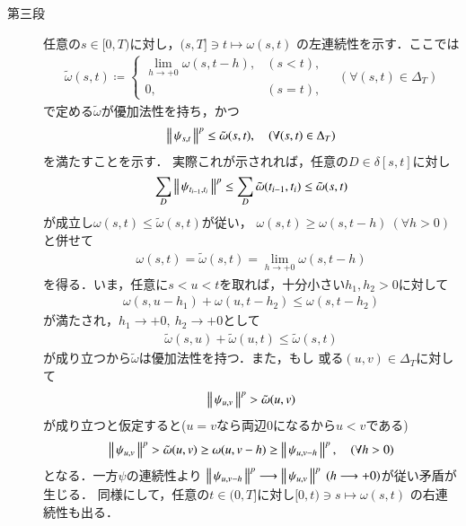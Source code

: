 \begin{prf}
\begin{description}
			\item[第三段]
				任意の$s \in [0,T)$に対し，$(s,T] \ni t \longmapsto \omega(s,t)$
				の左連続性を示す．ここでは
				\begin{align}
					\tilde{\omega}(s,t) \coloneqq 
					\begin{cases}
						\lim_{h \to +0}\omega(s,t-h), & (s < t), \\
						0, & (s=t),
					\end{cases}
					\quad (\forall (s,t) \in \Delta_T)
				\end{align}
				で定める$\tilde{\omega}$が優加法性を持ち，かつ
				\begin{align}
					\left\|\, \psi_{s,t}\, \right\|_{}^p \leq \tilde{\omega}(s,t),
					\quad (\forall (s,t) \in \Delta_T)
				\end{align}
				を満たすことを示す．
				実際これが示されれば，任意の$D \in \delta[s,t]$に対し
				\begin{align}
					\sum_D \left\|\, \psi_{t_{i-1},t_i}\, \right\|_{}^p
					\leq \sum_D \tilde{\omega}(t_{i-1},t_i)
					\leq \tilde{\omega}(s,t)
				\end{align}
				が成立し$\omega(s,t) \leq \tilde{\omega}(s,t)$が従い，
				$\omega(s,t) \geq \omega(s,t-h)\ (\forall h > 0)$と併せて
				\begin{align}
					\omega(s,t) = \tilde{\omega}(s,t) = \lim_{h \to +0} \omega(s,t-h)
				\end{align}
				を得る．いま，任意に$s < u < t$を取れば，十分小さい$h_1,h_2 > 0$に対して
				\begin{align}	
					\omega(s,u-h_1) + \omega(u,t-h_2) \leq \omega(s,t-h_2)
				\end{align}
				が満たされ，$h_1 \longrightarrow +0,\ h_2 \longrightarrow +0$として
				\begin{align}
					\tilde{\omega}(s,u) + \tilde{\omega}(u,t) \leq \tilde{\omega}(s,t)
				\end{align}
				が成り立つから$\tilde{\omega}$は優加法性を持つ．また，もし
				或る$(u,v) \in \Delta_T$に対して
				\begin{align}
					\left\|\, \psi_{u,v}\, \right\|_{}^p > \tilde{\omega}(u,v)
				\end{align}
				が成り立つと仮定すると($u = v$なら両辺0になるから$u < v$である)
				\begin{align}
					\left\|\, \psi_{u,v}\, \right\|_{}^p > \tilde{\omega}(u,v) \geq \omega(u,v-h) \geq \left\|\, \psi_{u,v-h}\, \right\|_{}^p,
					\quad (\forall h > 0)
				\end{align}
				となる．一方$\psi$の連続性より
				$\left\|\, \psi_{u,v-h}\, \right\|_{}^p \longrightarrow \left\|\, \psi_{u,v}\, \right\|_{}^p\ (h \longrightarrow +0)$が従い矛盾が生じる．
				同様にして，任意の$t \in (0,T]$に対し$[0,t) \ni s \longmapsto \omega(s,t)$
				の右連続性も出る．
				

\end{description}
\end{prf}
